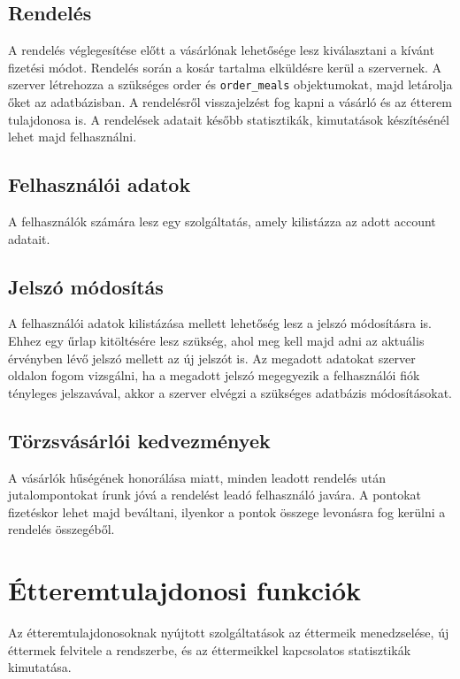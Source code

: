 \subsection{Rendelés}

A rendelés véglegesítése előtt a vásárlónak lehetősége lesz kiválasztani a kívánt fizetési módot. Rendelés során a kosár tartalma elküldésre kerül a szervernek. A szerver létrehozza a szükséges order és \texttt{order\_meals} objektumokat, majd letárolja őket az adatbázisban. A rendelésről visszajelzést fog kapni a vásárló és az étterem tulajdonosa is. A rendelések adatait később statisztikák, kimutatások készítésénél lehet majd felhasználni.

\subsection{Felhasználói adatok}

A felhasználók számára lesz egy szolgáltatás, amely kilistázza az adott account adatait.

\subsection{Jelszó módosítás}

A felhasználói adatok kilistázása mellett lehetőség lesz a jelszó módosításra is. Ehhez egy űrlap kitöltésére lesz szükség, ahol meg kell majd adni az aktuális érvényben lévő jelszó mellett az új jelszót is. Az megadott adatokat szerver oldalon fogom vizsgálni, ha a megadott jelszó megegyezik a felhasználói fiók tényleges jelszavával, akkor a szerver elvégzi a szükséges adatbázis módosításokat.

\subsection{Törzsvásárlói kedvezmények}

A vásárlók hűségének honorálása miatt, minden leadott rendelés után jutalompontokat írunk jóvá a rendelést leadó felhasználó javára. A pontokat fizetéskor lehet majd beváltani, ilyenkor a pontok összege levonásra fog kerülni a rendelés összegéből.

\section{Étteremtulajdonosi funkciók}

Az étteremtulajdonosoknak nyújtott szolgáltatások az éttermeik menedzselése, új éttermek felvitele a rendszerbe, és az éttermeikkel kapcsolatos statisztikák kimutatása.

